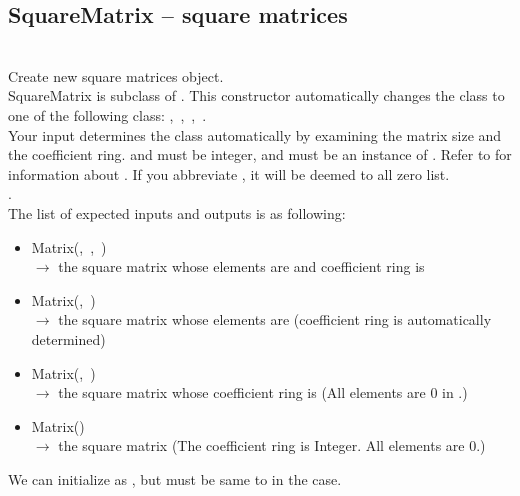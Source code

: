 \subsection{SquareMatrix -- square matrices}
 \initialize
  \\
  \spacing
  \quad Create new square matrices object.\\
  \spacing
  \quad SquareMatrix is subclass of .
  \negok This constructor automatically changes the class to one of the following class: ,\ ,\ ,\ .\\
  \spacing
  \quad Your input determines the class automatically by examining the matrix size and the coefficient ring.
    and  must be integer, and  must be an instance of .
   Refer to  for information about .
   If you abbreviate , it will be deemed to all zero list.\\
.\\
   The list of expected inputs and outputs is as following:
   \begin{itemize}
     \item Matrix(,\ ,\ )\\
       $\to$ the  square matrix whose elements are  and coefficient ring is 
     \item Matrix(,\ )\\
       $\to$ the  square matrix whose elements are  (coefficient ring is automatically determined)
     \item Matrix(,\ )\\
       $\to$ the  square matrix whose coefficient ring is  (All elements are $0$ in .)
     \item Matrix()\\
       $\to$ the  square matrix (The coefficient ring is Integer. All elements are $0$.)
   \end{itemize}
   \negok We can initialize as  , but  must be same to  in the case.
\method
